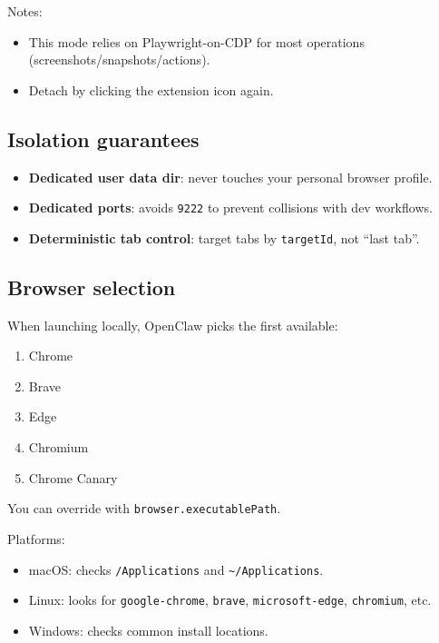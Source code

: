 Notes:

\begin{itemize}
  \item This mode relies on Playwright-on-CDP for most operations (screenshots/snapshots/actions).
  \item Detach by clicking the extension icon again.
\end{itemize}


\subsection{Isolation guarantees}


\begin{itemize}
  \item \textbf{Dedicated user data dir}: never touches your personal browser profile.
  \item \textbf{Dedicated ports}: avoids \texttt{9222} to prevent collisions with dev workflows.
  \item \textbf{Deterministic tab control}: target tabs by \texttt{targetId}, not “last tab”.
\end{itemize}


\subsection{Browser selection}


When launching locally, OpenClaw picks the first available:

\begin{enumerate}
  \item Chrome
  \item Brave
  \item Edge
  \item Chromium
  \item Chrome Canary
\end{enumerate}


You can override with \texttt{browser.executablePath}.

Platforms:

\begin{itemize}
  \item macOS: checks \texttt{/Applications} and \texttt{\textasciitilde{}/Applications}.
  \item Linux: looks for \texttt{google-chrome}, \texttt{brave}, \texttt{microsoft-edge}, \texttt{chromium}, etc.
  \item Windows: checks common install locations.
\end{itemize}


